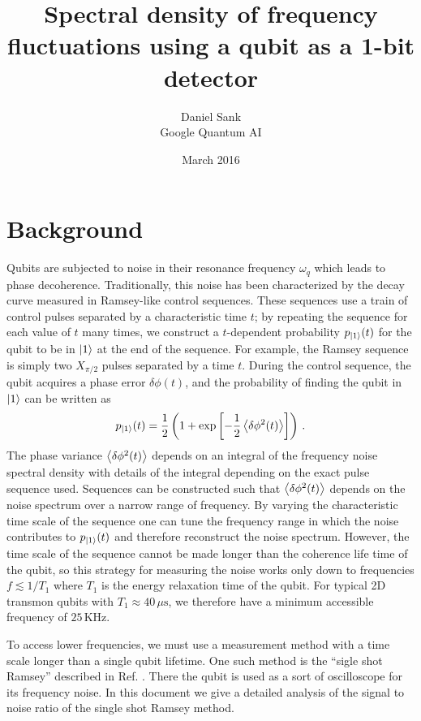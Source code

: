 \documentclass[twocolumn]{article}
\author{Daniel Sank \\ \small{Google Quantum AI}}
\title{Spectral density of frequency fluctuations using a qubit as a 1-bit detector}
\date{March 2016}
\begin{document}
\maketitle

\section{Background}

Qubits are subjected to noise in their resonance frequency $\omega_q$ which leads to phase decoherence.
Traditionally, this noise has been characterized by the decay curve measured in Ramsey-like control sequences.
These sequences use a train of control pulses separated by a characteristic time $t$; by repeating the sequence for each value of $t$ many times, we construct a $t$-dependent probability $p_{| 1 \rangle}(t)$ for the qubit to be in $| 1 \rangle$ at the end of the sequence.
For example, the Ramsey sequence is simply two $X_{\pi/2}$ pulses separated by a time $t$.
During the control sequence, the qubit acquires a phase error $\delta \phi(t)$, and the probability of finding the qubit in $| 1 \rangle$ can be written as
\begin{equation}
p_{| 1 \rangle}(t) = \frac{1}{2} \left( 1 + \exp \left[ - \frac{1}{2} \left \langle  \delta \phi^2(t) \right \rangle \right] \right) \, .
\end{equation}
The phase variance $\left \langle \delta \phi^2 (t) \right \rangle$ depends on an integral of the frequency noise spectral density with details of the integral depending on the exact pulse sequence used.
Sequences can be constructed such that $\left \langle \delta \phi^2(t) \right \rangle$ depends on the noise spectrum over a narrow range of frequency.
By varying the characteristic time scale of the sequence one can tune the frequency range in which the noise contributes to $p_{| 1 \rangle}(t)$ and therefore reconstruct the noise spectrum.
However, the time scale of the sequence cannot be made longer than the coherence life time of the qubit, so this strategy for measuring the noise works only down to frequencies $f \lesssim 1/T_1$ where $T_1$ is the energy relaxation time of the qubit.
For typical 2D transmon qubits with $T_1 \approx 40\,\mu\text{s}$, we therefore have a minimum accessible frequency of $25\,\text{KHz}$.

To access lower frequencies, we must use a measurement method with a time scale longer than a single qubit lifetime.
One such method is the ``sigle shot Ramsey'' described in Ref. \cite{Yan:fluxNoise2012}.
There the qubit is used as a sort of oscilloscope for its frequency noise.
In this document we give a detailed analysis of the signal to noise ratio of the single shot Ramsey method.
\end{document}
